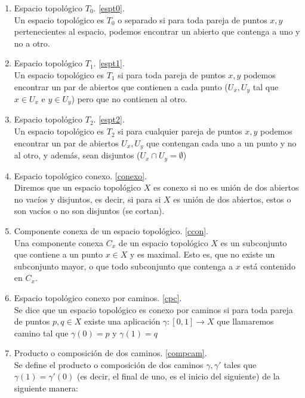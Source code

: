 \documentclass[12pt,twoside]{report}
\theoremstyle{azul}
\theoremstyle{azul2}
\theoremstyle{plain}
\theoremstyle{definition}
\theoremstyle{remark}
\begin{document}
\begin{enumerate}[1)]
    Sea $f: X \longrightarrow Y$ una aplicación donde $X$ es un espacio topológico e $Y$ es un conjunto, un subconjunto $V$ de $Y$ es abierto si $f^{-1}(V)$ es un abierto. Es la máxima topología en $Y$ tal que $f$ es continua.
    \item Espacio topológico $T_0$. \textcolor{blue}{\ref{espt0}.}\\
    Un espacio topológico es $T_0$ o separado si para toda pareja de puntos $x,y$ pertenecientes al espacio, podemos encontrar un abierto que contenga a uno y no a otro.
    \item Espacio topológico $T_1$. \textcolor{blue}{\ref{espt1}.}\\
    Un espacio topológico es $T_1$ si para toda pareja de puntos $x,y$ podemos encontrar un par de abiertos que contienen a cada punto ($U_x, U_y$ tal que $x \in U_x$ e $y \in U_y$) pero que no contienen al otro.
    \item Espacio topológico $T_2$. \textcolor{blue}{\ref{espt2}.} \\
    Un espacio topológico es $T_2$ si para cualquier pareja de puntos $x,y$ podemos encontrar un par de abiertos $U_x,U_y$ que contengan cada uno a un punto y no al otro, y además, sean disjuntos ($U_x \cap U_y = \emptyset$)
    \item Espacio topológico conexo. \textcolor{blue}{\ref{conexo}.}\\
    Diremos que un espacio topológico $X$ es conexo si no es unión de dos abiertos no vacíos y disjuntos, es decir, si para si $X$ es unión de dos abiertos, estos o son vacíos o no son disjuntos (se cortan).
    \item Componente conexa de un espacio topológico. \textcolor{blue}{\ref{ccon}.}\\
    Una componente conexa $C_x$ de un espacio topológico $X$ es un subconjunto que contiene a un punto $x \in X$ y es maximal. Esto es, que no existe un subconjunto mayor, o que todo subconjunto que contenga a $x$ está contenido en $C_x$.
    \item Espacio topológico conexo por caminos.  \textcolor{blue}{\ref{cpc}.} \\
    Se dice que un espacio topológico es conexo por caminos si para toda pareja de puntos $p,q \in X$ existe una aplicación $\gamma: [0,1] \longrightarrow X$ que llamaremos camino tal que $\gamma(0)=p$ y $\gamma(1)=q$
    \item Producto o composición de dos caminos. \textcolor{blue}{\ref{compcam}.} \\
    Se define el producto o composición de dos caminos $\gamma, \gamma'$ tales que $\gamma(1)=\gamma'(0)$ (es decir, el final de uno, es el inicio del siguiente) de la siguiente manera:  \\

\end{enumerate}
\end{document}
